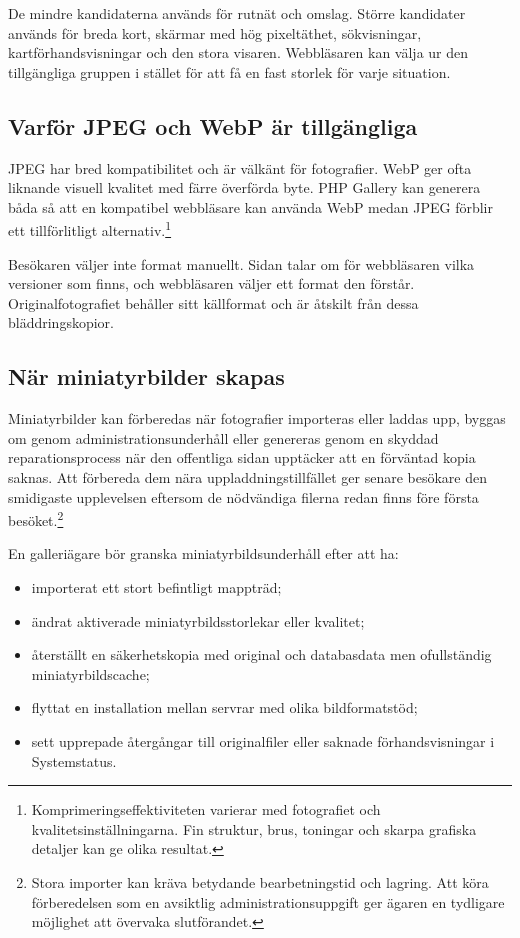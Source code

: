 \documentclass[11pt,a4paper]{article}
\begin{document}
De mindre kandidaterna används för rutnät och omslag. Större kandidater används
för breda kort, skärmar med hög pixeltäthet, sökvisningar, kartförhandsvisningar
och den stora visaren. Webbläsaren kan välja ur den tillgängliga gruppen i
stället för att få en fast storlek för varje situation.

\subsection{Varför JPEG och WebP är tillgängliga}

JPEG har bred kompatibilitet och är välkänt för fotografier. WebP ger ofta
liknande visuell kvalitet med färre överförda byte. PHP Gallery kan generera
båda så att en kompatibel webbläsare kan använda WebP medan JPEG förblir ett
tillförlitligt alternativ.\footnote{Komprimeringseffektiviteten varierar med
fotografiet och kvalitetsinställningarna. Fin struktur, brus, toningar och
skarpa grafiska detaljer kan ge olika resultat.}

Besökaren väljer inte format manuellt. Sidan talar om för webbläsaren vilka
versioner som finns, och webbläsaren väljer ett format den förstår.
Originalfotografiet behåller sitt källformat och är åtskilt från dessa
bläddringskopior.

\subsection{När miniatyrbilder skapas}

Miniatyrbilder kan förberedas när fotografier importeras eller laddas upp,
byggas om genom administrationsunderhåll eller genereras genom en skyddad
reparationsprocess när den offentliga sidan upptäcker att en förväntad kopia
saknas. Att förbereda dem nära uppladdningstillfället ger senare besökare den
smidigaste upplevelsen eftersom de nödvändiga filerna redan finns före första
besöket.\footnote{Stora importer kan kräva betydande bearbetningstid och
lagring. Att köra förberedelsen som en avsiktlig administrationsuppgift ger
ägaren en tydligare möjlighet att övervaka slutförandet.}

En galleriägare bör granska miniatyrbildsunderhåll efter att ha:

\begin{itemize}
  \item importerat ett stort befintligt mappträd;
  \item ändrat aktiverade miniatyrbildsstorlekar eller kvalitet;
  \item återställt en säkerhetskopia med original och databasdata men
  ofullständig miniatyrbildscache;
  \item flyttat en installation mellan servrar med olika bildformatstöd;
  \item sett upprepade återgångar till originalfiler eller saknade
  förhandsvisningar i Systemstatus.
\end{itemize}
\end{document}
